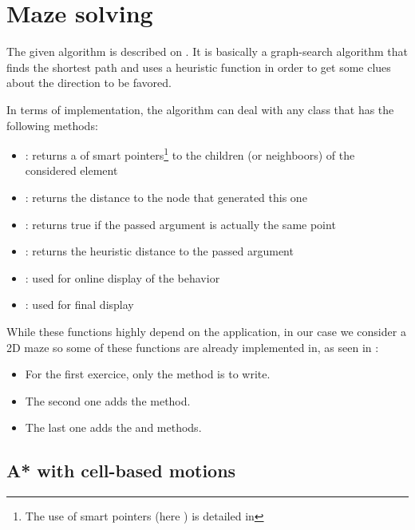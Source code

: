 \documentclass{ecnreport}
\begin{document}
\section{Maze solving}

The given algorithm is described on . It is basically a graph-search algorithm that
finds the shortest path and uses a heuristic function in order to get some clues about the direction to be favored.

In terms of implementation, the algorithm can deal with any  class that has the following methods:
\begin{itemize}
 \item {}: returns a  of smart pointers\footnote{The use of smart pointers (here ) is detailed in } to the children (or neighboors) of the considered
 element
 \item {}: returns the distance to the node that generated this one
 \item {}: returns true if the passed argument is actually the same point
 \item {}: returns the heuristic distance to the passed argument
 \item {}: used for online display of the behavior
 \item {}: used for final display
\end{itemize}


While these functions highly depend on the application, in our case we consider a 2D maze so some of these functions are already implemented in, as seen in :
\begin{itemize}
 \item For the first exercice, only the  method is to write.
 \item The second one adds the  method.
 \item The last one adds the  and  methods.
\end{itemize}



\subsection{A* with cell-based motions}
\end{document}
